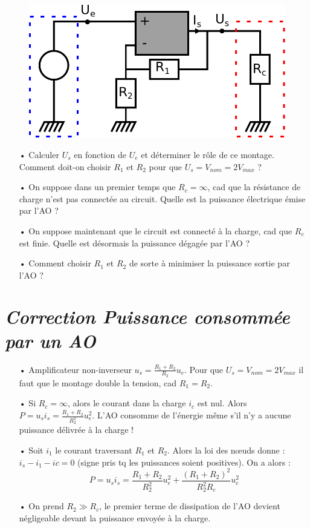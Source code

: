 \documentclass{report}
\begin{document}
\begin{figure}[!h]
\centering
\includegraphics[width=0.5\linewidth]{puissance_AO.pdf}
\end{figure}

\begin{itemize}
	\item[•] Calculer $U_s$ en fonction de $U_e$ et déterminer le rôle de ce montage. Comment doit-on choisir $R_1$ et $R_2$ pour que $U_s = V_{nom}=2V_{max}$ ?
	\item[•]  On suppose dans un premier temps que $R_c=\infty$, cad que la résistance de charge n'est pas connectée au circuit. Quelle est la puissance électrique émise par l'AO ?
	\item[•] On suppose maintenant que le circuit est connecté à la charge, cad que $R_c$ est finie. Quelle est désormais la puissance dégagée par l'AO ?
	\item[•] Comment choisir $R_1$ et $R_2$ de sorte à minimiser la puissance sortie par l'AO ?
\end{itemize}

\newpage

\section*{\textit{Correction Puissance consommée par un AO}}

\begin{itemize}
	\item[•] Amplificateur non-inverseur $u_s = \frac{R_1+R_2}{R_2}u_e$. Pour que $U_s = V_{nom}=2V_{max}$ il faut que le montage double la tension, cad $R_1=R_2$.
	\item[•]  Si $R_c=\infty$, alors le courant dans la charge $i_c$ est nul. Alors $P=u_si_s= \frac{R_1+R_2}{R_2^2}u_e^2$. L'AO consomme de l'énergie même s'il n'y a aucune puissance délivrée à la charge !
	\item[•] Soit $i_1$ le courant traversant $R_1$ et $R_2$. Alors la loi des nœuds donne : $i_s-i_1-ic=0$ (signe pris tq les puissances soient positives). On a alors :
	\begin{equation}
		P=u_si_s=\frac{R_1+R_2}{R_2^2}u_e^2+\frac{(R_1+R_2)^2}{R_2^2R_c}u_e^2
	\end{equation}
	\item[•] On prend $R_2\gg R_c$, le premier terme de dissipation de l'AO devient négligeable devant la puissance envoyée à la charge.
\end{itemize}
\end{document}
